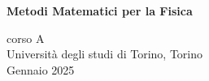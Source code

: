 \begin{titlepage}
   \begin{center}
       \vspace*{1cm}
        
       \textbf{\LARGE Metodi Matematici per la Fisica}

       \vspace{0.5cm}

       \vfill
            
       
            
       \vspace{0.8cm}
     
       
            
       corso A\\
       Università degli studi di Torino, Torino\\
       Gennaio 2025\\
       
            
   \end{center}
\end{titlepage}
